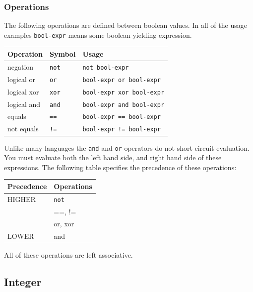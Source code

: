 \documentclass{article}
\begin{document}
	\subsubsection{Operations}

		The following operations are defined between boolean values. In all of  the usage examples \texttt{bool-expr}
		means some boolean yielding expression.

		\begin{center}
			\begin{tabular}{|l|l|l|}
				\hline
				\textbf{Operation} & \textbf{Symbol} & \textbf{Usage} \\
				\hline
				negation    & \texttt{not} & \texttt{not bool-expr}           \\
				logical or  & \texttt{or}  & \texttt{bool-expr or bool-expr}  \\
				logical xor & \texttt{xor} & \texttt{bool-expr xor bool-expr} \\
				logical and & \texttt{and} & \texttt{bool-expr and bool-expr} \\
				equals      & \texttt{==}	 & \texttt{bool-expr == bool-expr}  \\
				not equals  & \texttt{!=}	 & \texttt{bool-expr != bool-expr}  \\
				\hline
			\end{tabular}
		\end{center}

		Unlike many languages the \texttt{and} and \texttt{or} operators do not short circuit evaluation. You must
		evaluate both the left hand side, and right hand side of these expressions. The following table specifies the
		precedence of these operations:

		\begin{center}
			\begin{tabular}{|l|l|}
				\hline
				\textbf{Precedence} & \textbf{Operations} \\
				\hline
				HIGHER & \texttt{not} \\
				       & ==, !=       \\
				       & or, xor      \\
				LOWER  & and          \\
				\hline
			\end{tabular}
		\end{center}

		All of these operations are left associative.


	\subsection{Integer}\label{sec:integer}
\end{document}
